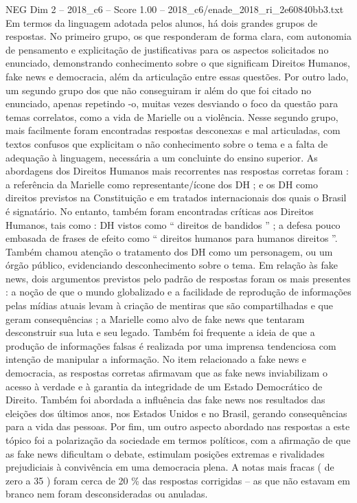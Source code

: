 \begin{textsample}{NEG Dim 2 – 2018\_c6 – Score 1.00 – 2018\_c6/enade\_2018\_ri\_2e60840bb3.txt}
Em termos da linguagem adotada pelos alunos, há dois grandes grupos de respostas.
No primeiro grupo, os que responderam de forma clara, com autonomia de pensamento e explicitação de justificativas para os aspectos solicitados no enunciado, demonstrando conhecimento sobre o que significam Direitos Humanos, fake news e democracia, além da articulação entre essas questões.
Por outro lado, um segundo grupo dos que não conseguiram ir além do que foi citado no enunciado, apenas repetindo -o, muitas vezes desviando o foco da questão para temas correlatos, como a vida de Marielle ou a violência.
Nesse segundo grupo, mais facilmente foram encontradas respostas desconexas e mal articuladas, com textos confusos que explicitam o não conhecimento sobre o tema e a falta de adequação à linguagem, necessária a um concluinte do ensino superior.
As abordagens dos Direitos Humanos mais recorrentes nas respostas corretas foram : a referência da Marielle como representante/ícone dos DH ; e os DH como direitos previstos na Constituição e em tratados internacionais dos quais o Brasil é signatário.
No entanto, também foram encontradas críticas aos Direitos Humanos, tais como : DH vistos como “ direitos de bandidos ” ; a defesa pouco embasada de frases de efeito como “ direitos humanos para humanos direitos ”.
Também chamou atenção o tratamento dos DH como um personagem, ou um órgão público, evidenciando desconhecimento sobre o tema.
Em relação às fake news, dois argumentos previstos pelo padrão de respostas foram os mais presentes : a noção de que o mundo globalizado e a facilidade de reprodução de informações pelas mídias atuais levam à criação de mentiras que são compartilhadas e que geram consequências ; a Marielle como alvo de fake news que tentaram desconstruir sua luta e seu legado.
Também foi frequente a ideia de que a produção de informações falsas é realizada por uma imprensa tendenciosa com intenção de manipular a informação.
No item relacionado a fake news e democracia, as respostas corretas afirmavam que as fake news inviabilizam o acesso à verdade e à garantia da integridade de um Estado Democrático de Direito.
Também foi abordada a influência das fake news nos resultados das eleições dos últimos anos, nos Estados Unidos e no Brasil, gerando consequências para a vida das pessoas.
Por fim, um outro aspecto abordado nas respostas a este tópico foi a polarização da sociedade em termos políticos, com a afirmação de que as fake news dificultam o debate, estimulam posições extremas e rivalidades prejudiciais à convivência em uma democracia plena.
A notas mais fracas ( de zero a 35 ) foram cerca de 20 \% das respostas corrigidas – as que não estavam em branco nem foram desconsideradas ou anuladas.

\end{textsample}
